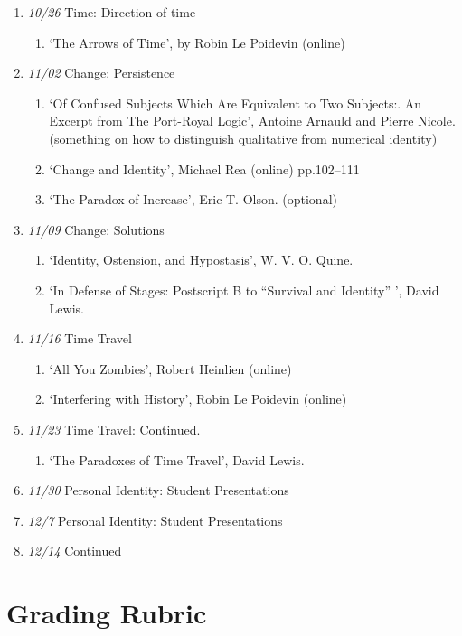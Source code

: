 \documentclass[11pt,article,oneside]{memoir}
\begin{document}
\begin{enumerate}
\item \textit{10/26} Time: Direction of time
\begin{enumerate}
\item `The Arrows of Time', by Robin Le Poidevin (online)
\end{enumerate}

\item \textit{11/02} Change: Persistence
\begin{enumerate}
\item `Of Confused Subjects Which Are Equivalent to Two Subjects:. An Excerpt from The Port-Royal Logic', Antoine Arnauld and Pierre Nicole. (something on how to distinguish qualitative from numerical identity)
\item `Change and Identity', Michael Rea (online) pp.102--111 
\item `The Paradox of Increase', Eric T. Olson. (optional)
\end{enumerate}
\item \textit{11/09} Change: Solutions
\begin{enumerate}
 \item `Identity, Ostension, and Hypostasis', W. V. O. Quine.
\item `In Defense of Stages: Postscript B to ``Survival and Identity'' ', David Lewis.
\end{enumerate}
\item \textit{11/16} Time Travel
\begin{enumerate}
\item `All You Zombies', Robert Heinlien (online)
\item  `Interfering with History', Robin Le Poidevin (online)
\end{enumerate}
\item \textit{11/23} Time Travel: Continued.
\begin{enumerate}
\item `The Paradoxes of Time Travel', David Lewis.
\end{enumerate}
\item \textit{11/30} Personal Identity: Student Presentations
\item \textit{12/7}  Personal Identity: Student Presentations
\item \textit{12/14} Continued
\end{enumerate}

\newpage
\section{Grading Rubric}
\end{document}
